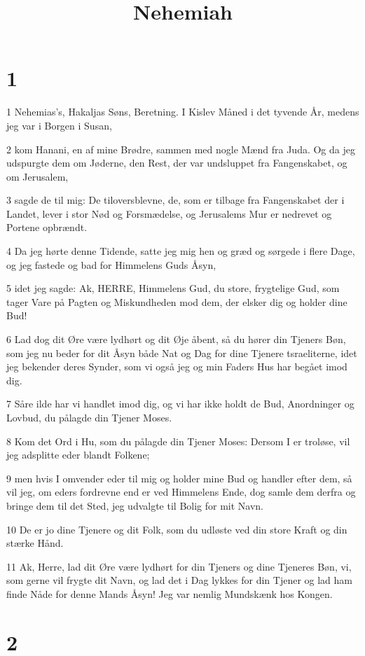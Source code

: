 

\title{Nehemiah}


\chapter{1}

\par 1 Nehemias's, Hakaljas Søns, Beretning. I Kislev Måned i det tyvende År, medens jeg var i Borgen i Susan,
\par 2 kom Hanani, en af mine Brødre, sammen med nogle Mænd fra Juda. Og da jeg udspurgte dem om Jøderne, den Rest, der var undsluppet fra Fangenskabet, og om Jerusalem,
\par 3 sagde de til mig: De tiloversblevne, de, som er tilbage fra Fangenskabet der i Landet, lever i stor Nød og Forsmædelse, og Jerusalems Mur er nedrevet og Portene opbrændt.
\par 4 Da jeg hørte denne Tidende, satte jeg mig hen og græd og sørgede i flere Dage, og jeg fastede og bad for Himmelens Guds Åsyn,
\par 5 idet jeg sagde: Ak, HERRE, Himmelens Gud, du store, frygtelige Gud, som tager Vare på Pagten og Miskundheden mod dem, der elsker dig og holder dine Bud!
\par 6 Lad dog dit Øre være lydhørt og dit Øje åbent, så du hører din Tjeners Bøn, som jeg nu beder for dit Åsyn både Nat og Dag for dine Tjenere tsraeliterne, idet jeg bekender deres Synder, som vi også jeg og min Faders Hus har begået imod dig.
\par 7 Såre ilde har vi handlet imod dig, og vi har ikke holdt de Bud, Anordninger og Lovbud, du pålagde din Tjener Moses.
\par 8 Kom det Ord i Hu, som du pålagde din Tjener Moses: Dersom I er troløse, vil jeg adsplitte eder blandt Folkene;
\par 9 men hvis I omvender eder til mig og holder mine Bud og handler efter dem, så vil jeg, om eders fordrevne end er ved Himmelens Ende, dog samle dem derfra og bringe dem til det Sted, jeg udvalgte til Bolig for mit Navn.
\par 10 De er jo dine Tjenere og dit Folk, som du udløste ved din store Kraft og din stærke Hånd.
\par 11 Ak, Herre, lad dit Øre være lydhørt for din Tjeners og dine Tjeneres Bøn, vi, som gerne vil frygte dit Navn, og lad det i Dag lykkes for din Tjener og lad ham finde Nåde for denne Mands Åsyn! Jeg var nemlig Mundskænk hos Kongen.

\chapter{2}

